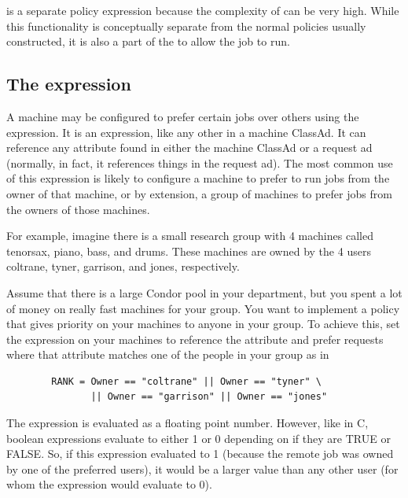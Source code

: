 is a separate policy expression because the complexity of
 can be very high.
While this
functionality is conceptually separate from the normal 
policies usually constructed, it is also a part of the 
to allow the job to run.

\subsection{\label{sec:Rank-Expression}
The  expression}

A machine may be configured to prefer certain jobs over others
using the  expression.
It is an
expression, like any other in a machine ClassAd.
It can
reference any attribute found in either the machine ClassAd or a
request ad (normally, in fact, it references things in the request
ad).
The most common use of this expression is likely to configure a
machine to prefer to run jobs from the owner of that machine, or by
extension, a group of machines to prefer jobs from the owners of those
machines.

For example, imagine there is a small research group with 4 machines
called tenorsax, piano, bass, and drums.
These machines are owned by the 4 users
coltrane, tyner, garrison, and jones,
respectively.  

Assume that there is a large Condor pool in your department,
but you spent a lot of money on really fast machines for your group.
You want to implement a policy
that gives priority on your machines to
anyone in your group.
To achieve this, set the 
expression on your machines to reference the  attribute and
prefer requests where that attribute matches one of the people in your
group as in
\begin{verbatim}
        RANK = Owner == "coltrane" || Owner == "tyner" \
               || Owner == "garrison" || Owner == "jones"
\end{verbatim}

The  expression is evaluated as a floating point number.
However, like in C, boolean expressions evaluate to either 1 or 0
depending on if they are TRUE or FALSE.
So, if this expression
evaluated to 1 (because the remote job was owned by one of the 
preferred users), it would be a larger value than any other
user (for whom the expression would evaluate to 0).

